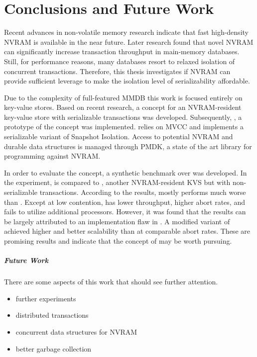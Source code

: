 \chapter{Conclusions and Future Work}
\label{ch:summary}

Recent advances in non-volatile memory research indicate that fast high-density
NVRAM is available in the near future. Later research found that novel NVRAM can
significantly increase transaction throughput in main-memory databases. Still,
for performance reasons, many databases resort to relaxed isolation of
concurrent transactions. Therefore, this thesis investigates if NVRAM can
provide sufficient leverage to make the isolation level of serializability
affordable.

Due to the complexity of full-featured MMDB this work is focused entirely on
key-value stores. Based on recent research, a concept for an NVRAM-resident
key-value store with serializable transactions was developed. Subsequently,
\midas, a prototype of the concept was implemented. \midas relies on MVCC and
implements a serializable variant of Snapshot Isolation. Access to potential
NVRAM and durable data structures is managed through PMDK, a state of the art
library for programming against NVRAM.

In order to evaluate the concept, a synthetic benchmark over \ttp was developed.
In the experiment, \midas is compared to \echo, another NVRAM-resident KVS but
with non-serializable transactions. According to the results, \midas mostly
performs much worse than \echo. Except at low contention, \midas has lower
throughput, higher abort rates, and fails to utilize additional processors.
However, it was found that the results can be largely attributed to an
implementation flaw in \midas. A modified variant of \midas achieved higher
\tput and better scalability than \echo at comparable abort rates. These are
promising results and indicate that the concept of \midas may be worth pursuing.

\paragraph{Future Work}

There are some aspects of this work that should see further attention.

\begin{itemize}
    \item further experiments
    \item distributed transactions
    \item concurrent data structures for NVRAM
    \item better garbage collection
\end{itemize}

